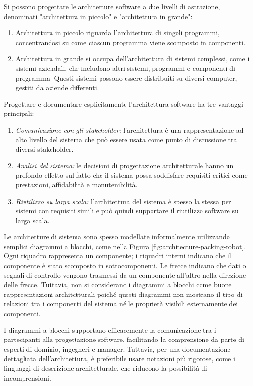 Si possono progettare le architetture software a due livelli di astrazione, denominati "architettura in piccolo" e "architettura in grande":
\begin{enumerate}
    \item Architettura in piccolo riguarda l'architettura di singoli programmi, concentrandosi su come ciascun programma viene scomposto in componenti.
    \item Architettura in grande si occupa dell'architettura di sistemi complessi, come i sistemi aziendali, che includono altri sistemi, programmi e componenti di programma. Questi sistemi possono essere distribuiti su diversi computer, gestiti da aziende differenti.
\end{enumerate}
Progettare e documentare esplicitamente l'architettura software ha tre vantaggi principali:
\begin{enumerate}
    \item \textit{Comunicazione con gli stakeholder:} l'architettura è una rappresentazione ad alto livello del sistema che può essere usata come punto di discussione tra diversi stakeholder.
    \item \textit{Analisi del sistema:} le decisioni di progettazione architetturale hanno un profondo effetto sul fatto che il sistema possa soddisfare requisiti critici come prestazioni, affidabilità e manutenibilità.
    \item \textit{Riutilizzo su larga scala:} l'architettura del sistema è spesso la stessa per sistemi con requisiti simili e può quindi supportare il riutilizzo software su larga scala.
\end{enumerate}
Le architetture di sistema sono spesso modellate informalmente utilizzando semplici diagrammi a blocchi, come nella Figura \ref{fig:architecture-packing-robot}. Ogni riquadro rappresenta un componente; i riquadri interni indicano che il componente è stato scomposto in sottocomponenti. Le frecce indicano che dati o segnali di controllo vengono trasmessi da un componente all'altro nella direzione delle frecce. Tuttavia, non si considerano i diagrammi a blocchi come buone rappresentazioni architetturali poiché questi diagrammi non mostrano il tipo di relazioni tra i componenti del sistema né le proprietà visibili esternamente dei componenti.

I diagrammi a blocchi supportano efficacemente la comunicazione tra i partecipanti alla progettazione software, facilitando la comprensione da parte di esperti di dominio, ingegneri e manager. Tuttavia, per una documentazione dettagliata dell'architettura, è preferibile usare notazioni più rigorose, come i linguaggi di descrizione architetturale, che riducono la possibilità di incomprensioni.

